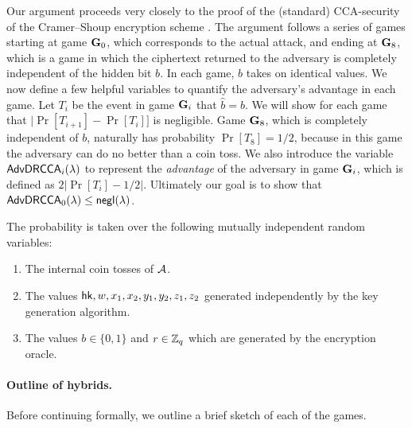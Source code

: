 Our argument proceeds very closely to the proof of the (standard) CCA-security of the Cramer--Shoup encryption scheme \cite[Section~6.2]{cs01}. The argument follows a series of games starting at game $\mathbf{G}_0$, which corresponds to the actual attack, and ending at $\mathbf{G}_8$, which is a game in which the ciphertext returned to the adversary is completely independent of the hidden bit $b$. In each game, $b$ takes on identical values. We now define a few helpful variables to quantify the adversary's advantage in each game. Let $T_i$ be the event in game $\mathbf{G}_i$ that $\hat{b}=b$. We will show for each game that $|\Pr[T_{i+1}] - \Pr[T_i]]$ is negligible. Game $\mathbf{G}_8$, which is completely independent of $b$, naturally has probability $\Pr[T_8]=1/2$, because in this game the adversary can do no better than a coin toss. We also introduce the variable $\mathsf{AdvDRCCA}_i(\lambda)$ to represent the \textit{advantage} of the adversary in game $\mathbf{G}_i$, which is defined as $2|\Pr[T_i]-1/2|$. Ultimately our goal is to show that $\mathsf{AdvDRCCA}_0(\lambda)\leq\mathsf{negl}(\lambda)$.

The probability is taken over the following mutually independent random variables:	\begin{enumerate}
	\item The internal coin tosses of $\mathcal{A}$.
	\item The values $\mathsf{hk},w,x_1,x_2,y_1,y_2,z_1,z_2$ generated independently by the key generation algorithm.
	\item The values $b\in\{0,1\}$ and $r\in\mathbb{Z}_q$ which are generated by the encryption oracle.
\end{enumerate}

\paragraph{Outline of hybrids.} Before continuing formally, we outline a brief sketch of each of the games.

